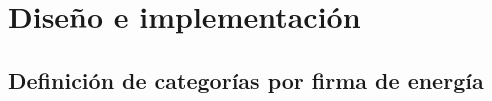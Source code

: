 \chapter{Diseño e implementación}
\label{ch:implementacion}



\section{Definición de categorías por firma de energía}
\label{sec:categorias_energia}

%

